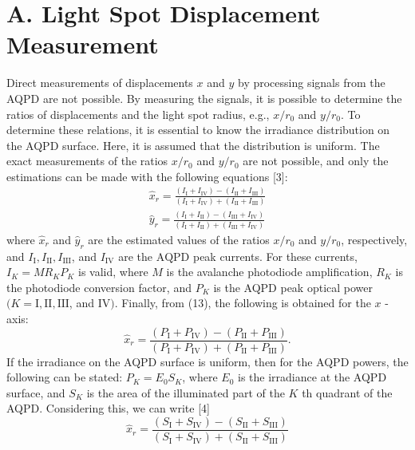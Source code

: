 \documentclass[10pt]{article}
\begin{document}
\section{A. Light Spot Displacement Measurement}
Direct measurements of displacements \(x\) and \(y\) by processing signals from the AQPD are not possible. By measuring the signals, it is possible to determine the ratios of displacements and the light spot radius, e.g., \(x / r_{0}\) and \(y / r_{0}\). To determine these relations, it is essential to know the irradiance distribution on the AQPD surface. Here, it is assumed that the distribution is uniform. The exact measurements of the ratios \(x / r_{0}\) and \(y / r_{0}\) are not possible, and only the estimations can be made with the following equations [3]:
\[
\begin{array}{l}
\hat{x}_{r}=\frac{\left(I_{\mathrm{I}}+I_{\mathrm{IV}}\right)-\left(I_{\mathrm{II}}+I_{\mathrm{III}}\right)}{\left(I_{\mathrm{I}}+I_{\mathrm{IV}}\right)+\left(I_{\mathrm{II}}+I_{\mathrm{III}}\right)} \\
\hat{y}_{r}=\frac{\left(I_{\mathrm{I}}+I_{\mathrm{II}}\right)-\left(I_{\mathrm{III}}+I_{\mathrm{IV}}\right)}{\left(I_{\mathrm{I}}+I_{\mathrm{II}}\right)+\left(I_{\mathrm{III}}+I_{\mathrm{IV}}\right)}
\end{array}
\]
where \(\hat{x}_{r}\) and \(\hat{y}_{r}\) are the estimated values of the ratios \(x / r_{0}\) and \(y / r_{0}\), respectively, and \(I_{\mathrm{I}}, I_{\mathrm{II}}, I_{\mathrm{III}}\), and \(I_{\mathrm{IV}}\) are the \(\mathrm{AQPD}\) peak currents. For these currents, \(I_{K}=M R_{K} P_{K}\) is valid, where \(M\) is the avalanche photodiode amplification, \(R_{K}\) is the photodiode conversion factor, and \(P_{K}\) is the AQPD peak optical power \((K=\mathrm{I}, \mathrm{II}, \mathrm{III}\), and \(\mathrm{IV})\). Finally, from (13), the following is obtained for the \(x\) -axis:
\[
\hat{x}_{r}=\frac{\left(P_{\mathrm{I}}+P_{\mathrm{IV}}\right)-\left(P_{\mathrm{II}}+P_{\mathrm{III}}\right)}{\left(P_{\mathrm{I}}+P_{\mathrm{IV}}\right)+\left(P_{\mathrm{II}}+P_{\mathrm{III}}\right)} .
\]
If the irradiance on the AQPD surface is uniform, then for the AQPD powers, the following can be stated: \(P_{K}=E_{0} S_{K}\), where \(E_{0}\) is the irradiance at the AQPD surface, and \(S_{K}\) is the area of the illuminated part of the \(K\) th quadrant of the AQPD. Considering this, we can write [4]
\[
\hat{x}_{r}=\frac{\left(S_{\mathrm{I}}+S_{\mathrm{IV}}\right)-\left(S_{\mathrm{II}}+S_{\mathrm{III}}\right)}{\left(S_{\mathrm{I}}+S_{\mathrm{IV}}\right)+\left(S_{\mathrm{II}}+S_{\mathrm{III}}\right)}
\]
\end{document}
